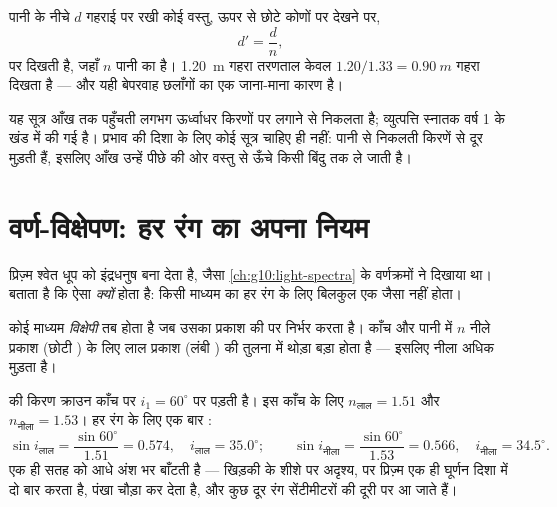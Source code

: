 \begin{proposition}[आभासी गहराई]\label{prop:g10:refraction:depth}
पानी के नीचे $d$ गहराई पर रखी कोई वस्तु, ऊपर से छोटे कोणों पर देखने
पर, \emph{}
\[
d' = \frac{d}{n} ,
\]
पर दिखती है, जहाँ $n$ पानी का  है। \qty{1.20}{m} गहरा तरणताल
केवल $1.20/1.33 = \qty{0.90}{m}$ गहरा दिखता है --- और यही बेपरवाह छलाँगों का एक जाना-माना
कारण है।
\end{proposition}
\admitted

\begin{remark}\label{rem:g10:refraction:depthhonest}
यह सूत्र आँख तक पहुँचती लगभग ऊर्ध्वाधर किरणों पर 
लगाने से निकलता है; व्युत्पत्ति स्नातक वर्ष 1 के खंड में की गई है।
प्रभाव की दिशा के लिए कोई सूत्र चाहिए ही नहीं: पानी से निकलती किरणें
 से दूर मुड़ती हैं, इसलिए आँख उन्हें पीछे की ओर वस्तु से
ऊँचे किसी बिंदु तक ले जाती है।
\end{remark}

\section{वर्ण-विक्षेपण: हर रंग का अपना नियम}

प्रिज़्म श्वेत धूप को इंद्रधनुष बना देता है, जैसा \cref{ch:g10:light-spectra} के वर्णक्रमों
ने दिखाया था।  बताता है कि ऐसा \emph{क्यों} होता है:
किसी माध्यम का  हर रंग के लिए बिलकुल एक जैसा नहीं
होता।

\begin{definition}[वर्ण-विक्षेपण]\label{def:g10:refraction:dispersion}
कोई माध्यम \emph{विक्षेपी} तब होता है जब उसका
 प्रकाश की  पर निर्भर करता है।
काँच और पानी में $n$ नीले प्रकाश (छोटी ) के लिए
लाल प्रकाश (लंबी ) की तुलना में थोड़ा बड़ा होता है
--- इसलिए नीला अधिक मुड़ता है।
\end{definition}

\begin{example}[दो रंग, एक सतह]\label{ex:g10:refraction:twocolors}
 की किरण क्राउन काँच पर $i_1 = 60^\circ$ पर पड़ती है। इस
काँच के लिए $n_{\text{लाल}} = 1.51$ और $n_{\text{नीला}} = 1.53$। हर रंग के लिए एक बार :
\[
\sin i_{\text{लाल}} = \frac{\sin 60^\circ}{1.51} = 0.574,
\quad i_{\text{लाल}} = 35.0^\circ ;
\qquad
\sin i_{\text{नीला}} = \frac{\sin 60^\circ}{1.53} = 0.566,
\quad i_{\text{नीला}} = 34.5^\circ .
\]
एक ही सतह  को आधे अंश भर बाँटती है --- खिड़की के
शीशे पर अदृश्य, पर प्रिज़्म एक ही घूर्णन दिशा में दो बार  करता
है, पंखा चौड़ा कर देता है, और कुछ  दूर रंग सेंटीमीटरों की दूरी पर
आ जाते हैं।
\end{example}


